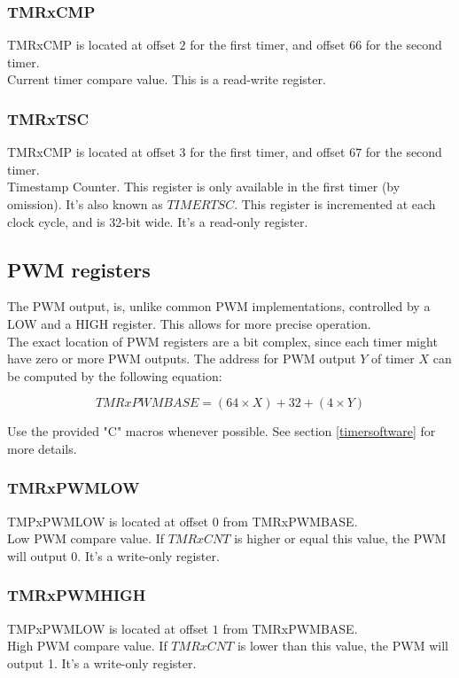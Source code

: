 \subsubsection{TMRxCMP}

TMRxCMP is located at offset $2$ for the first timer, and offset $66$ for the second timer. \\
Current timer compare value. This is a read-write register.

\subsubsection{TMRxTSC}

TMRxCMP is located at offset $3$ for the first timer, and offset $67$ for the second timer. \\
Timestamp Counter. This register is only available in the first timer (by omission). It's also known as $TIMERTSC$.
This register is incremented at each clock cycle, and is 32-bit wide. It's a read-only register.

\subsection{PWM registers}

The PWM output, is, unlike common PWM implementations, controlled by a LOW and a HIGH register. This allows for 
more precise operation. \\
The exact location of PWM registers are a bit complex, since each timer might have zero or more PWM outputs.
The address for PWM output $Y$ of timer $X$ can be computed by the following equation:

\begin{displaymath}
TMRxPWMBASE = ( 64 \times X) + 32 + ( 4 \times Y )
\end{displaymath}

Use the provided "C" macros whenever possible. See section \ref{timersoftware} for more details.

\subsubsection{TMRxPWMLOW}
TMPxPWMLOW is located at offset $0$ from TMRxPWMBASE.\\
Low PWM compare value. If $TMRxCNT$ is higher or equal this value, the PWM will output 0. It's a write-only register.
\subsubsection{TMRxPWMHIGH}
TMPxPWMLOW is located at offset $1$ from TMRxPWMBASE.\\
High PWM compare value. If $TMRxCNT$ is lower than this value, the PWM will output 1. It's a write-only register.
